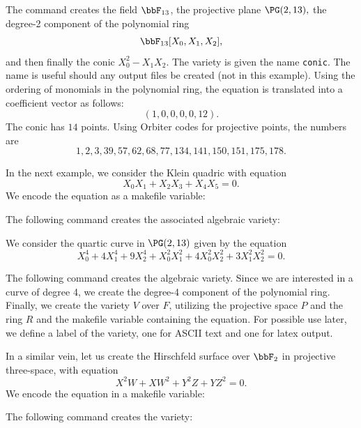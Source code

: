 
The command creates the field $\bbF_{13}$, the projective plane $\PG(2,13),$ 
the degree-2 component of the 
polynomial ring 
$$
\bbF_{13}[X_0,X_1,X_2],
$$
and then finally the conic $X_0^2-X_1X_2$.
The variety is given the name \verb'conic'. 
The name is useful should any output files be created (not in this example). 
Using the ordering of monomials in the polynomial ring, 
the equation is translated into a coefficient vector as follows:
$$
(1, 0, 0, 0, 0, 12).
$$
The conic has $14$ points. 
Using Orbiter codes for projective points, the numbers are 
$$
1, 2, 3, 39, 57, 62, 68, 77, 134, 141, 150, 151, 175, 178.
$$

\bigskip


In the next example, we consider the Klein quadric with equation
$$
X_0X_1 + X_2X_3 + X_4X_5 = 0.
$$
We encode the equation as a makefile variable:


The following command creates the associated algebraic variety:





\bigskip




We consider the quartic curve in $\PG(2,13)$ given by the equation
$$
X_0^4 + 4X_1^4 + 9X_2^4 + X_0^2X_1^2 + 4X_0^2X_2^2 + 3X_1^2X_2^2=0.
$$


The following command creates the algebraic variety.
Since we are interested in a curve of degree 4, 
we create the degree-4 component of the polynomial ring. 
Finally, we create the variety $V$ over $F$, utilizing the projective 
space $P$ and the ring $R$ and the makefile variable containing the equation. 
For possible use later, we define a label of the variety, 
one for ASCII text and one for latex output. 




\bigskip


In a similar vein, let us create the 
Hirschfeld surface over $\bbF_2$ in projective three-space, 
with equation 
$$
X^2W+XW^2+Y^2Z+YZ^2=0.
$$
We encode the equation in a makefile variable:




The following command creates the variety:


